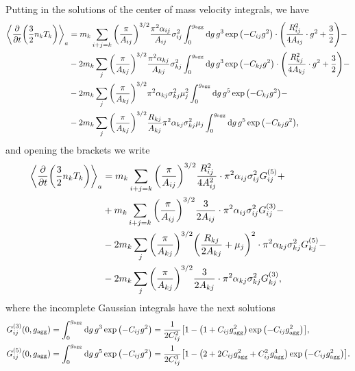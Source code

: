 \documentclass[aps,prl,preprint,groupedaddress,10pt]{revtex4-2}
\begin{document}
Putting in the solutions of the center of mass velocity integrals, we have
\begin{equation}
    \begin{split}
        \avg{\pdv{t}\pqty{\frac{3}{2}n_k T_k}}_a&=m_k\sum_{i+j=k}\pqty{\frac{\pi}{A_{ij}}}^{3/2}
        \frac{\pi^2\alpha_{ij}}{A_{ij}}\sigma_{ij}^2
        \int_{0}^{\ltx{g}{agg}}\dd{g}g^3\exp\pqty{-C_{ij}g^2}\cdot
        \pqty{\frac{R_{ij}^2}{4A_{ij}}\cdot g^2+\frac{3}{2}}-\\
        &-2m_k\sum_{j}\pqty{\frac{\pi}{A_{kj}}}^{3/2}\frac{\pi^2\alpha_{kj}}{A_{kj}}\sigma_{kj}^2
        \int_{0}^{\ltx{g}{agg}}\dd{g}g^3\exp\pqty{-C_{kj}g^2}\cdot
        \pqty{\frac{R_{kj}^2}{4A_{kj}}\cdot g^2+\frac{3}{2}}-\\
        &-2m_k\sum_{j}\pqty{\frac{\pi}{A_{kj}}}^{3/2}\pi^2\alpha_{kj}\sigma_{kj}^2\mu_j^2
        \int_{0}^{\ltx{g}{agg}}\dd{g}g^5\exp\pqty{-C_{kj}g^2}-\\
        &-2m_k\sum_{j}\pqty{\frac{\pi}{A_{kj}}}^{3/2}\frac{R_{kj}}{A_{kj}}\pi^2\alpha_{kj}
        \sigma_{kj}^2\mu_j
        \int_{0}^{\ltx{g}{agg}}\dd{g}g^5\exp\pqty{-C_{kj}g^2},
    \end{split}
\end{equation}
and opening the brackets we write
\begin{equation}
    \begin{split}
        \avg{\pdv{t}\pqty{\frac{3}{2}n_k T_k}}_a&=m_k\sum_{i+j=k}\pqty{\frac{\pi}{A_{ij}}}^{3/2}
        \frac{R_{ij}^2}{4A_{ij}^2}\cdot\pi^2\alpha_{ij}\sigma_{ij}^2G^{(5)}_{ij}+\\
        &+m_k\sum_{i+j=k}\pqty{\frac{\pi}{A_{ij}}}^{3/2}
        \frac{3}{2A_{ij}}\cdot\pi^2\alpha_{ij}\sigma_{ij}^2G^{(3)}_{ij}-\\
        &-2m_k\sum_{j}\pqty{\frac{\pi}{A_{kj}}}^{3/2}
        \pqty{\frac{R_{kj}}{2A_{kj}}+\mu_j}^2
        \cdot\pi^2\alpha_{kj}\sigma_{kj}^2G^{(5)}_{kj}-\\
        &-2m_k\sum_{j}\pqty{\frac{\pi}{A_{kj}}}^{3/2}\frac{3}{2A_{kj}}
        \cdot\pi^2\alpha_{kj}\sigma_{kj}^2G^{(3)}_{kj},
    \end{split}
\end{equation}
where the incomplete Gaussian integrals have the next solutions
\begin{equation}
    \begin{split}
        G^{(3)}_{ij}(0,\ltx{g}{agg})=\int_{0}^{\ltx{g}{agg}}\dd{g}g^3\exp\pqty{-C_{ij}g^2}&=
        \frac{1}{2C_{ij}^2}\bqty{1-\pqty{1+C_{ij}\ltx{g}{agg}^2}\exp\pqty{-C_{ij}\ltx{g}{agg}^2}},\\
        G^{(5)}_{ij}(0,\ltx{g}{agg})=\int_{0}^{\ltx{g}{agg}}\dd{g}g^5\exp\pqty{-C_{ij}g^2}&=\frac{1}{2C_{ij}^3}
        \bqty{1-\pqty{2+2C_{ij}\ltx{g}{agg}^2+C_{ij}^2\ltx{g}{agg}^4}\exp\pqty{-C_{ij}\ltx{g}{agg}^2}}.\\
    \end{split}
\end{equation}
\end{document}
